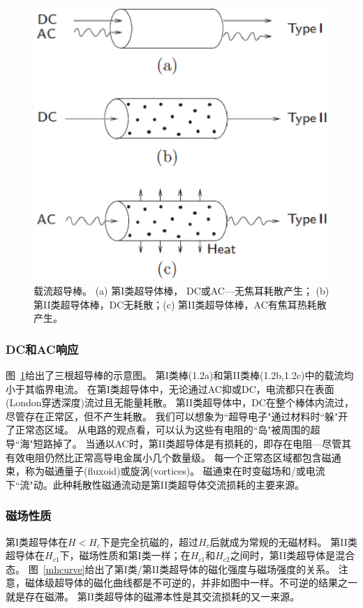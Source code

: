 \begin{figure}[htbp]
	\centering
	\includegraphics[scale=0.6]{chpt1/figs/fig1.2.eps}
	\caption{
		载流超导棒。 (a) 第I类超导体棒， DC或AC---无焦耳耗散产生；
		(b) 第II类超导体棒，DC无耗散；(c) 第II类超导体棒，AC有焦耳热耗散产生。}\label{acdccurrent}
\end{figure}

\subsubsection{DC和AC响应}
图~\ref{acdccurrent}给出了三根超导棒的示意图。
第I类棒(1.2a)和第II类棒(1.2b,1.2c)中的载流均小于其临界电流。
在第I类超导体中，无论通过AC抑或DC，电流都只在表面(London穿透深度)流过且无能量耗散。
第II类超导体中，DC在整个棒体内流过，尽管存在正常区，但不产生耗散。
我们可以想象为``超导电子"通过材料时``躲"开了正常态区域。
从电路的观点看，可以认为这些有电阻的``岛"被周围的超导``海"短路掉了。
当通以AC时，第II类超导体是有损耗的，即存在电阻---尽管其有效电阻仍然比正常高导电金属小几个数量级。
每一个正常态区域都包含磁通束，称为磁通量子(fluxoid)或旋涡(vortices)。
磁通束在时变磁场和/或电流下``流"动。此种耗散性磁通流动是第II类超导体交流损耗的主要来源。

\subsubsection{磁场性质}
第I类超导体在$H<H_c$下是完全抗磁的，超过$H_c$后就成为常规的无磁材料。
第II类超导体在$H_{c1}$下，磁场性质和第I类一样；在$H_{c1}$和$H_{c2}$之间时，第II类超导体是混合态。
图~\ref{mhcurve}给出了第I类/第II类超导体的磁化强度与磁场强度的关系。
注意，磁体级超导体的磁化曲线都是不可逆的，并非如图中一样。不可逆的结果之一就是存在磁滞。
第II类超导体的磁滞本性是其交流损耗的又一来源。

